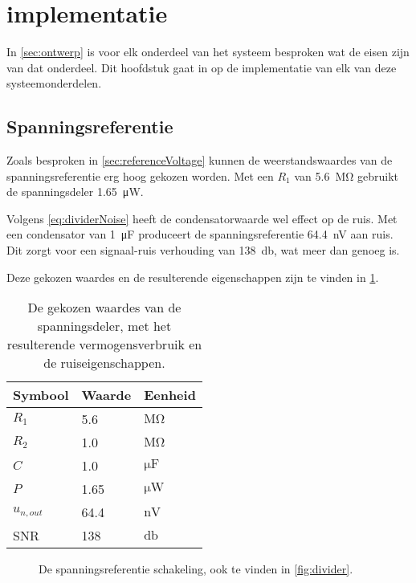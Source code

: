 \section{implementatie}
In \cref{sec:ontwerp} is voor elk onderdeel van het systeem besproken wat de eisen zijn van dat onderdeel. Dit hoofdstuk gaat in op de implementatie van elk van deze systeemonderdelen.

\subsection{Spanningsreferentie}
Zoals besproken in \cref{sec:referenceVoltage} kunnen de weerstandswaardes van de spanningsreferentie erg hoog gekozen worden. Met een $R_1$ van \qty{5.6}{\mega\ohm} gebruikt de spanningsdeler \qty{1.65}{\micro\watt}.

Volgens \cref{eq:dividerNoise} heeft de condensatorwaarde wel effect op de ruis. Met een condensator van \qty{1}{\micro\farad} produceert de spanningsreferentie \qty{64.4}{\nano\volt} aan ruis. Dit zorgt voor een signaal-ruis verhouding van \qty{138}{\decibel}, wat meer dan genoeg is.

Deze gekozen waardes en de resulterende eigenschappen zijn te vinden in \cref{tab:divider}.

\begin{table}[!htbp]
    \centering
    \begin{tabular}{l|l|l}
        Symbool & Waarde & Eenheid \\
        \hline
        $R_1$       & 5.6  & $\si{\mega\ohm}$   \\
        $R_2$       & 1.0  & $\si{\mega\ohm}$   \\
        $C$         & 1.0  & $\si{\micro\farad}$\\
        $P$         & 1.65 & $\si{\micro\watt}$ \\
        $u_{n,out}$ & 64.4 & $\si{\nano\volt}$  \\
        SNR         & 138  & $\si{\decibel}$
    \end{tabular}
    \caption{De gekozen waardes van de spanningsdeler, met het resulterende vermogensverbruik en de ruiseigenschappen.}
    \label{tab:divider}
\end{table}

\begin{figure}[!htbp]
    \centering
    \def\svgwidth{7cm}
    
    \caption{De spanningsreferentie schakeling, ook te vinden in \cref{fig:divider}.}
    \label{fig:dividerForContext}
\end{figure}

